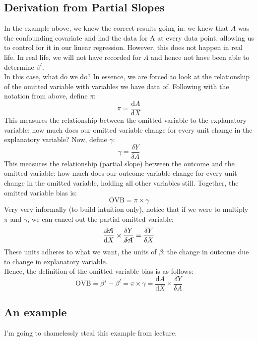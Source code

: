 \documentclass{article}
\begin{document}
\subsection{Derivation from Partial Slopes}
In the example above, we knew the correct results going in: we knew that $A$ was the confounding covariate and had the data for A at every data point, allowing us to control for it in our linear regression.
However, this does not happen in real life.
In real life, we will not have recorded for $A$ and hence not have been able to determine $\beta^l$.
\\
In this case, what do we do?
In essence, we are forced to look at the relationship of the omitted variable with variables we have data of.
Following with the notation from above, define $\pi$:
$$\pi = \frac{\text{d}A}{\text{d}X}$$
This measures the relationship between the omitted variable to the explanatory variable: how much does our omitted variable change for every unit change in the explanatory variable?
Now, define $\gamma$:
$$\gamma = \frac{\delta Y}{\delta A}$$
This measures the relationship (partial slope) between the outcome and the omitted variable: how much does our outcome variable change for every unit change in the omitted variable, holding all other variables still.
Together, the omitted variable bias is:
$$\text{OVB} = \pi \times \gamma $$
Very very informally (to build intuition only), notice that if we were to multiply $\pi$ and $\gamma$, we can cancel out the partial omitted variable:
$$\frac{\cancel{\text{d}A}}{\text{d}X} \times \frac{\delta Y}{\cancel{\delta A}} = \frac{\delta Y}{\delta X}$$
These units adheres to what we want, the units of $\beta$: the change in outcome due to change in explanatory variable. 
\\
Hence, the definition of the omitted variable bias is as follows:
$$\text{OVB} = \beta^s - \beta^l = \pi \times \gamma = \frac{\text{d}A}{\text{d}X} \times \frac{\delta Y}{\delta A}$$

\subsection{An example}
I'm going to shamelessly steal this example from lecture.
\end{document}
